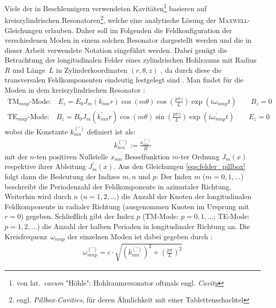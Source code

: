 Viele der in Beschleunigern verwendeten Kavitäten\footnote{von lat.\ \emph{cavum} "Höhle": Hohlraumresonator oftmals engl. \emph{Cavity}} basieren auf kreiszylindrischen Resonatoren\footnote{engl. \emph{Pillbox-Cavities}, für deren Ähnlichkeit mit einer Tablettenschachtel}, welche eine analytische Lösung der \textsc{Maxwell}-Gleichungen erlauben.
Daher soll im Folgenden die Feldkonfiguration der verschiedenen Moden in einem solchen Resonator dargestellt werden und die in dieser Arbeit verwendete Notation eingeführt werden.
Dabei genügt die Betrachtung der longitudinalen Felder eines zylindrischen Hohlraums mit Radius~$R$ und Länge~$L$ in Zylinderkoordinaten $(r, \theta, z)$ , da durch diese die transversalen Feldkomponenten eindeutig festgelegt sind \cite[S.\ 4]{hillert}.
Man findet für die Moden in dem kreiszylindrischen Resonator \cite[S. 28 ff.]{wangler}:
\begin{subequations}
  \begin{align}
  \mathrm{TM}_{mnp}\text{-Mode:} \quad E_z = E_0 J_m(k_{mn} r) \cos(m \theta) \cos\left(\frac{p \pi z}{L}\right) \exp(i \omega_{mnp} t) \qquad B_z = 0\\
  \mathrm{TE}_{mnp}\text{-Mode:} \quad B_z = B_0 J_m(k_{mn}^\prime r) \cos(m \theta) \sin\left(\frac{p \pi z}{L}\right) \exp(i \omega_{mnp}^\prime t) \qquad  E_z = 0
  \end{align}
  \label{eqs:felder_pillbox}
\end{subequations}
wobei die Konstante $k_{mn}^{(\prime)}$ definiert ist als:
\begin{align}
k_{mn}^{(\prime)} := \frac{x_{mn}^{(\prime)}}{R}
\end{align}
mit der $n$-ten positiven Nullstelle $x_{mn}$ Besselfunktion $m$-ter Ordnung $J_m(x)$ respektive ihrer Ableitung $J_m^\prime(x)$.
Aus den Gleichungen \eqref{eqs:felder_pillbox} folgt dann die Bedeutung der Indizes $m, n$ und $p$:
Der Index $m$ ($m=0, 1, \dots$) beschreibt die Periodenzahl der Feldkomponente in azimutaler Richtung.
Weiterhin wird durch $n$ ($n=1, 2, \dots$) die Anzahl der Knoten der longitudinalen Feldkomponente in radialer Richtung (ausgenommen Knoten im Ursprung mit $r=0$) gegeben.
Schließlich gibt der Index $p$ (TM-Mode: $p= 0, 1, \dots$; TE-Mode: $p = 1, 2, \dots$) die Anzahl der halben Perioden in longitudinaler Richtung an.
Die Kreisfrequenz~$\omega_{mnp}$ der einzelnen Moden ist dabei gegeben durch \cite[S.\ 28 ff.]{wangler}:
\begin{align}
\omega_{mnp}^{(\prime)} = c \cdot \sqrt{\left( k_{mn}^{(\prime)}\right)^2 + \left( \frac{p \pi}{L} \right)^2}
\end{align}

